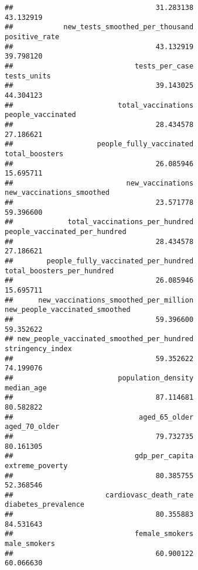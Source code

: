 \documentclass[
]{article}
\begin{document}
\begin{verbatim}
##                                  31.283138                                  43.132919 
##            new_tests_smoothed_per_thousand                              positive_rate 
##                                  43.132919                                  39.798120 
##                             tests_per_case                                tests_units 
##                                  39.143025                                  44.304123 
##                         total_vaccinations                          people_vaccinated 
##                                  28.434578                                  27.186621 
##                    people_fully_vaccinated                             total_boosters 
##                                  26.085946                                  15.695711 
##                           new_vaccinations                  new_vaccinations_smoothed 
##                                  23.571778                                  59.396600 
##             total_vaccinations_per_hundred              people_vaccinated_per_hundred 
##                                  28.434578                                  27.186621 
##        people_fully_vaccinated_per_hundred                 total_boosters_per_hundred 
##                                  26.085946                                  15.695711 
##      new_vaccinations_smoothed_per_million             new_people_vaccinated_smoothed 
##                                  59.396600                                  59.352622 
## new_people_vaccinated_smoothed_per_hundred                           stringency_index 
##                                  59.352622                                  74.199076 
##                         population_density                                 median_age 
##                                  87.114681                                  80.582822 
##                              aged_65_older                              aged_70_older 
##                                  79.732735                                  80.161305 
##                             gdp_per_capita                            extreme_poverty 
##                                  80.385755                                  52.368546 
##                      cardiovasc_death_rate                        diabetes_prevalence 
##                                  80.355883                                  84.531643 
##                             female_smokers                               male_smokers 
##                                  60.900122                                  60.066630 

\end{verbatim}
\end{document}
